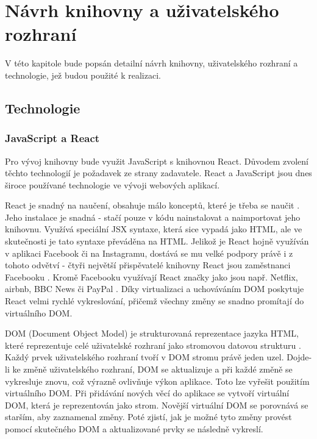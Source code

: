 \documentclass[czech, bc, kiv, he, iso690numb]{fasthesis}
\begin{document}
%
%
%
%
\chapter{Návrh knihovny a uživatelského rozhraní}

V této kapitole bude popsán detailní návrh knihovny, uživatelského rozhraní a technologie, jež budou použité k realizaci. 

\section{Technologie}

\subsection{JavaScript a React}
Pro vývoj knihovny bude využit JavaScript s knihovnou React. Důvodem zvolení těchto technologií je požadavek ze strany zadavatele. React a JavaScript jsou dnes
široce používané technologie ve vývoji webových aplikací. 

React je snadný na naučení, obsahuje málo konceptů, které je třeba se naučit \cite{whyUsingReact}. Jeho instalace je snadná -
stačí pouze v kódu nainstalovat a naimportovat jeho knihovnu. Využívá speciální JSX syntaxe, která sice vypadá jako HTML, ale ve skutečnosti je tato syntaxe převáděna na HTML. Jelikož je React hojně využíván
v aplikaci Facebook či na Instagramu, dostává se mu velké podpory právě i z tohoto odvětví - čtyři největší přispěvatelé knihovny React jsou zaměstnanci Facebooku \cite{whyUsingReact}. Kromě 
Facebooku využívají React značky jako jsou např. Netflix, airbnb, BBC News či PayPal \cite{whyUsingReact2}. Díky virtualizaci a uchováváním DOM poskytuje React
velmi rychlé vykreslování, přičemž všechny změny se snadno promítají do virtuálního DOM. 

DOM (Document Object Model) je strukturovaná reprezentace jazyka HTML, které reprezentuje celé uživatelské rozhraní jako stromovou datovou strukturu \cite{whatIsDOM}. Každý prvek uživatelského
rozhraní tvoří v DOM stromu právě jeden uzel. Dojde-li ke změně uživatelského rozhraní, DOM se aktualizuje 	a při každé změně se vykresluje znovu, což výrazně ovlivňuje výkon aplikace. 
Toto lze vyřešit použitím virtuálního DOM. Při přidávání nových věcí do aplikace se vytvoří virtuální DOM, která je reprezentován jako strom. Novější virtuální DOM se porovnává se starším, aby
zaznamenal změny. Poté zjistí, jak je možné tyto změny provést pomocí skutečného DOM a aktualizované prvky se následně vykreslí.
\end{document}
